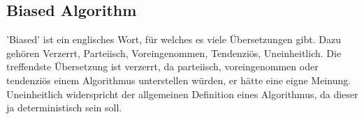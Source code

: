 \subsection[biased]{Biased Algorithm}
'Biased' ist ein englisches Wort, für welches es viele Übersetzungen gibt. Dazu gehören Verzerrt, Parteiisch, Voreingenommen, Tendenziös, Uneinheitlich. Die treffendste Übersetzung ist verzerrt, da parteiisch, voreingenommen oder tendenziös einem Algorithmus unterstellen würden, er hätte eine eigne Meinung. Uneinheitlich widerspricht der allgemeinen Definition eines Algorithmus, da dieser ja deterministisch sein soll.  
